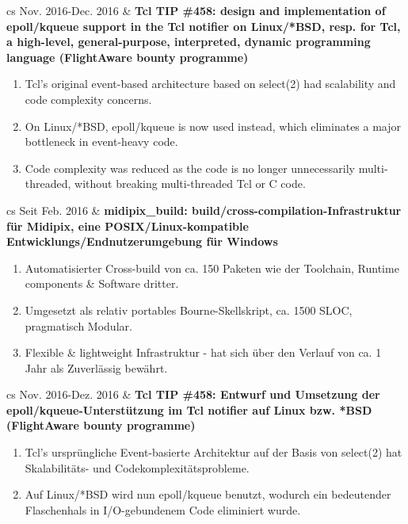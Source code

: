 \documentclass{article}
\begin{document}
\begin{table}
{\begin{enumerate}
    \end{enumerate}
    \begin{tabularx}{\linewidth}{cs}
      Nov. 2016-Dec. 2016 & \bf{Tcl TIP \#458: design and implementation of epoll/kqueue support in the Tcl notifier on Linux/*BSD, resp. for Tcl, a high-level, general-purpose, interpreted, dynamic programming language (FlightAware bounty programme)}
    \end{tabularx}
    \begin{enumerate}
      \item Tcl's original event-based architecture based on select(2) had scalability and code complexity concerns.
      \item On Linux/*BSD, epoll/kqueue is now used instead, which eliminates a major bottleneck in event-heavy code.
      \item Code complexity was reduced as the code is no longer unnecessarily multi-threaded, without breaking multi-threaded Tcl or C code.
    \end{enumerate}
  }{
    \caption{Projektbeteiligungen}
    \begin{tabularx}{\linewidth}{cs}
      Seit Feb. 2016 & \bf{midipix\_build: build/cross-compilation-Infrastruktur für Midipix, eine POSIX/Linux-kompatible Entwicklungs/Endnutzerumgebung für Windows}
    \end{tabularx}
    \begin{enumerate}
      \item Automatisierter Cross-build von ca. 150 Paketen wie der Toolchain, Runtime components \& Software dritter.
      \item Umgesetzt als relativ portables Bourne-Skellskript, ca. 1500 SLOC, pragmatisch Modular.
      \item Flexible \& lightweight Infrastruktur - hat sich über den Verlauf von ca. 1 Jahr als Zuverlässig bewährt.
    \end{enumerate}
    \begin{tabularx}{\linewidth}{cs}
      Nov. 2016-Dez. 2016 & \bf{Tcl TIP \#458: Entwurf und Umsetzung der epoll/kqueue-Unterstützung im Tcl notifier auf Linux bzw. *BSD (FlightAware bounty programme)}
    \end{tabularx}
    \begin{enumerate}
      \item Tcl's ursprüngliche Event-basierte Architektur auf der Basis von select(2) hat Skalabilitäts- und Codekomplexitätsprobleme.
      \item Auf Linux/*BSD wird nun epoll/kqueue benutzt, wodurch ein bedeutender Flaschenhals in I/O-gebundenem Code eliminiert wurde.

\end{enumerate}}
\end{table}
\end{document}
